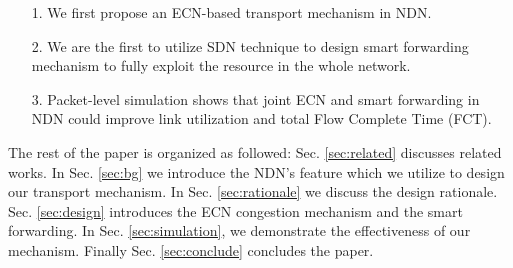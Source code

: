 \begin{enumerate}
	\item[1.] We first propose an ECN-based transport mechanism in NDN.
	\item[2.] We are the first to utilize SDN technique to design smart forwarding mechanism to fully exploit the resource in the whole network.
	\item[3.] Packet-level simulation shows that joint ECN and smart forwarding in NDN could improve link utilization and total Flow Complete Time (FCT).
\end{enumerate}

The rest of the paper is organized as followed: Sec. \ref{sec:related} discusses related works. In Sec. \ref{sec:bg} we introduce the NDN's feature which we utilize to design our transport mechanism. In Sec. \ref{sec:rationale} we discuss the design rationale. Sec. \ref{sec:design} introduces the ECN congestion mechanism and the smart forwarding. In Sec. \ref{sec:simulation}, we demonstrate the effectiveness of our mechanism. Finally Sec. \ref{sec:conclude} concludes the paper.

